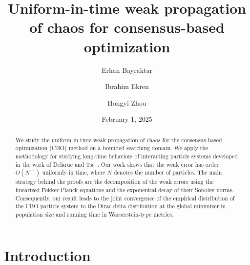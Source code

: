 \documentclass{amsart}
\begin{document}
\title[uniform propagation for CBO]{Uniform-in-time weak propagation of chaos for consensus-based optimization}


\author[Bayraktar]{Erhan Bayraktar}
\address{%
	Department of Mathematics,
	University of Michigan,
	Ann Arbor, MI 48109.}

\author[Ekren]{Ibrahim Ekren}
\address{%
	Department of Mathematics,
	University of Michigan,
	Ann Arbor, MI 48109.}

\author[Zhou]{Hongyi Zhou}
\address{%
	Department of Mathematics,
	University of Michigan,
	Ann Arbor, MI 48109.}

\date{February 1, 2025}


\begin{abstract}
	We study the uniform-in-time weak propagation of chaos for the consensus-based optimization (CBO) method on a bounded searching domain.
	We apply the methodology for studying long-time behaviors of interacting particle systems developed in the work of Delarue and Tse~\cite{DelarueTse2021}. 
	Our work shows that the weak error has order $O(N^{-1})$ uniformly in time, where $N$ denotes the number of particles. 
	The main strategy behind the proofs are the decomposition of the weak errors using the linearized Fokker-Planck equations and the exponential decay of their Sobolev norms.
	Consequently, our result leads to the joint convergence of the empirical distribution of the CBO particle system to the Dirac-delta distribution at the global minimizer in population size and running time in Wasserstein-type metrics.
\end{abstract}

\maketitle

\tableofcontents



\section{Introduction}
\end{document}
